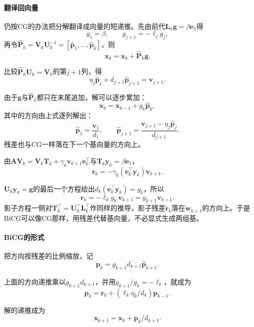 \paragraph{翻译回向量}
仍按CG的办法把分解翻译成向量的短递推。先由前代$\bm L_k\bm g=\beta\bm e_1$得
\[
 g_1=\beta,\qquad g_{j+1}=-\ell_jg_j ,
\]
再令$\widehat{\bm P}_k=\bm V_k\bm U_k^{-1}=[\hat{\bm p}_1,\ldots,\hat{\bm p}_k]$，则
\[
 \bm x_k=\bm x_0+\widehat{\bm P}_k\bm g .
\]

比较$\widehat{\bm P}_k\bm U_k=\bm V_k$的第$j+1$列，得
\[
 \eta_j\hat{\bm p}_j+d_{j+1}\hat{\bm p}_{j+1}=\bm v_{j+1} .
\]

由于$\bm g$与$\widehat{\bm P}_k$都只在末尾追加，解可以逐步累加：
\[
 \bm x_k=\bm x_{k-1}+g_k\hat{\bm p}_k ,
\]
其中的方向由上式逐列解出：
\[
 \hat{\bm p}_1=\frac{\bm v_1}{d_1},\qquad \hat{\bm p}_{j+1}=\frac{\bm v_{j+1}-\eta_j\hat{\bm p}_j}{d_{j+1}} .
\]
残差也与CG一样落在下一个基向量的方向上。

由$\bm A\bm V_k=\bm V_k\bm T_k+\gamma_k\bm v_{k+1}\bm e_k^\top$与$\bm T_k\bm y_k=\beta\bm e_1$，
\[
 \bm r_k=-\gamma_k(\bm e_k^\top\bm y_k)\bm v_{k+1} .
\]

$\bm U_k\bm y_k=\bm g$的最后一个方程给出$d_k(\bm e_k^\top\bm y_k)=g_k$，所以
\begin{equation}
 \bm r_k=-\ell_kg_k\,\bm v_{k+1}=g_{k+1}\bm v_{k+1} .
 \label{eq:ls-bicg-residual-direction}
\end{equation}
影子方程一侧对$\bm T_k^\top=\bm U_k^\top\bm L_k^\top$作同样的推导，影子残差$\widetilde{\bm r}_k$落在$\bm w_{k+1}$的方向上。于是BiCG可以像CG那样，用残差代替基向量，不必显式生成两组基。

\paragraph{BiCG的形式}
把方向按残差的比例缩放，记
\[
 \bm p_k=g_{k+1}d_{k+1}\hat{\bm p}_{k+1} .
\]

上面的方向递推乘以$g_{k+1}d_{k+1}$，并用$g_{k+1}/g_k=-\ell_k$，就成为
\[
 \bm p_k=\bm r_k+(\ell_k\eta_k/d_k)\bm p_{k-1} .
\]

解的递推成为
\[
 \bm x_{k+1}=\bm x_k+\bm p_k/d_{k+1} .
\]


